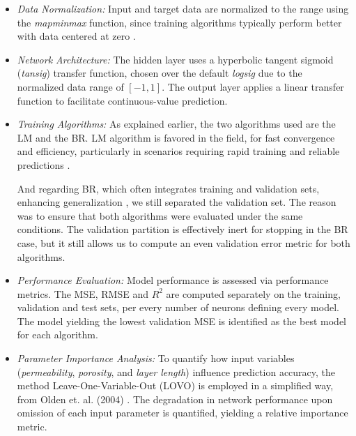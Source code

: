 \documentclass[10pt]{article}
\begin{document}
	\begin{itemize}
		\item \textit{Data Normalization:} Input and target data are normalized to the range  using the \textit{mapminmax} function, since training algorithms typically perform better with data centered at zero \cite{guzman2017,taherdangkoo2020}.
		
		\item \textit{Network Architecture:} The hidden layer uses a hyperbolic tangent sigmoid (\textit{tansig}) \cite{matlab-tansig} transfer function, chosen over the default \textit{logsig} \cite{matlab-logsig} due to the normalized data range of \([-1, 1]\). The output layer applies a linear transfer function to facilitate continuous-value prediction.
		
		\item \textit{Training Algorithms:} As explained earlier, the two algorithms used are the LM and the BR. LM algorithm is favored in the field, for fast convergence and efficiency, particularly in scenarios requiring rapid training and reliable predictions \cite{taherdangkoo2020}.
		
		And regarding BR, which often integrates training and validation sets, enhancing generalization \cite{guzman2017,taherdangkoo2020,foresee1997}, we still separated the validation set. The reason was to ensure that both algorithms were evaluated under the same conditions. The validation partition is effectively inert for stopping in the BR case, but it still allows us to compute an even validation error metric for both algorithms.
		
		\item \textit{Performance Evaluation:} Model performance is assessed via performance metrics. The MSE, RMSE and $R^{2}$ are computed separately on the training, validation and test sets, per every number of neurons defining every model. The model yielding the lowest validation MSE is identified as the best model for each algorithm.
		
		\item \textit{Parameter Importance Analysis:} To quantify how input variables (\textit{permeability}, \textit{porosity}, and \textit{layer length}) influence prediction accuracy, the method Leave-One-Variable-Out (LOVO) is employed in a simplified way, from Olden et. al. (2004) \cite{olden2004}. The degradation in network performance upon omission of each input parameter is quantified, yielding a relative importance metric.
		
	\end{itemize}
	
\end{document}
